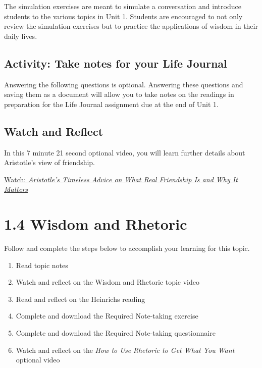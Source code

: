 \documentclass[
]{book}
\providecommand{\tightlist}{%
  \setlength{\itemsep}{0pt}\setlength{\parskip}{0pt}}
\begin{document}
\begin{reflect}
The simulation exercises are meant to simulate a conversation and introduce students to the various topics in Unit 1. Students are encouraged to not only review the simulation exercises but to practice the applications of wisdom in their daily lives.
\end{reflect}

\hypertarget{activity-take-notes-for-your-life-journal}{%
\subsection*{Activity: Take notes for your Life Journal}\label{activity-take-notes-for-your-life-journal}}

\begin{reflect}
Answering the following questions is optional. Answering these questions and saving them as a document will allow you to take notes on the readings in preparation for the Life Journal assignment due at the end of Unit 1.
\end{reflect}

\hypertarget{watch-and-reflect-6}{%
\subsection*{Watch and Reflect}\label{watch-and-reflect-6}}

\begin{reflect}
In this 7 minute 21 second optional video, you will learn further details about Aristotle's view of friendship.

\href{https://www.youtube.com/watch?v=F18kSA8OxqY}{Watch: \emph{Aristotle's Timeless Advice on What Real Friendship Is and Why It Matters}}
\end{reflect}

\hypertarget{wisdom-and-rhetoric}{%
\section*{1.4 Wisdom and Rhetoric}\label{wisdom-and-rhetoric}}

Follow and complete the steps below to accomplish your learning for this topic.

\begin{enumerate}
\def\labelenumi{\arabic{enumi}.}
\tightlist
\item
  Read topic notes
\item
  Watch and reflect on the Wisdom and Rhetoric topic video
\item
  Read and reflect on the Heinrichs reading
\item
  Complete and download the Required Note-taking exercise
\item
  Complete and download the Required Note-taking questionnaire
\item
  Watch and reflect on the \emph{How to Use Rhetoric to Get What You Want} optional video
\end{enumerate}
\end{document}
